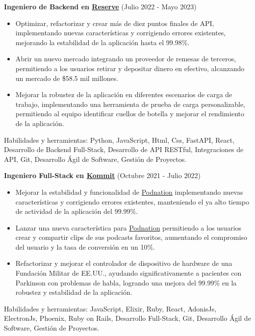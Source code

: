 \documentclass[letterpaper,10pt]{article}
\begin{document}
  \vspace*{0.2cm}
  \textbf{Ingeniero de Backend en \href{https://reserve.org/}{Reserve}} (Julio 2022 - Mayo 2023)
  \hfill
  \vspace*{0.2cm}
  \begin{minipage}{\linewidth}
    \begin{itemize}[noitemsep]
      \item Optimizar, refactorizar y crear más de diez puntos finales de API, implementando nuevas características y corrigiendo errores existentes, mejorando la estabilidad de la aplicación hasta el 99.98\%.
      \item Abrir un nuevo mercado integrando un proveedor de remesas de terceros, permitiendo a los usuarios retirar y depositar dinero en efectivo, alcanzando un mercado de \$58.5 mil millones.
      \item Mejorar la robustez de la aplicación en diferentes escenarios de carga de trabajo, implementando una herramienta de prueba de carga personalizable, permitiendo al equipo identificar cuellos de botella y mejorar el rendimiento de la aplicación.
    \end{itemize}
    \hfill
  \end{minipage}
  Habilidades y herramientas: Python, JavaScript, Html, Css, FastAPI, React, Desarrollo de Backend Full-Stack, Desarrollo de API RESTful, Integraciones de API, Git, Desarrollo Ágil de Software, Gestión de Proyectos.
  
  \vspace*{0.2cm}
  \textbf{Ingeniero Full-Stack en \href{https://kommit.co/}{Kommit}} (Octubre 2021 - Julio 2022)
  \hfill
  \vspace*{0.2cm}
  \begin{minipage}{\linewidth}
    \begin{itemize}[noitemsep]
      \item Mejorar la estabilidad y funcionalidad de \href{https://www.podnation.co/}{Podnation} implementando nuevas características y corrigiendo errores existentes, manteniendo el ya alto tiempo de actividad de la aplicación del 99.99\%.
      \item Lanzar una nueva característica para \href{https://www.podnation.co/}{Podnation} permitiendo a los usuarios crear y compartir clips de sus podcasts favoritos, aumentando el compromiso del usuario y la tasa de conversión en un 10\%.
      \item Refactorizar y mejorar el controlador de dispositivo de hardware de una Fundación Militar de EE.UU., ayudando significativamente a pacientes con Parkinson con problemas de habla, logrando una mejora del 99.99\% en la robustez y estabilidad de la aplicación.
    \end{itemize}
    \hfill
  \end{minipage}
  Habilidades y herramientas: JavaScript, Elixir, Ruby, React, AdonisJs, ElectronJs, Phoenix, Ruby on Rails, Desarrollo Full-Stack, Git, Desarrollo Ágil de Software, Gestión de Proyectos.
\end{document}
